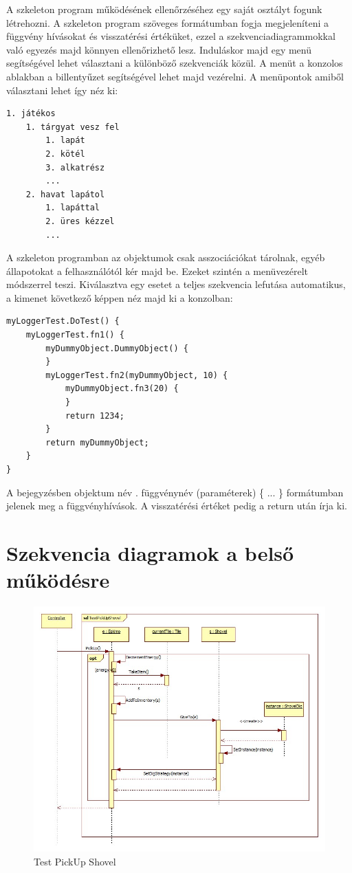 A szkeleton program működésének ellenőrzéséhez egy saját osztályt fogunk létrehozni. A szkeleton program szöveges formátumban fogja megjeleníteni a függvény hívásokat és visszatérési értéküket, ezzel a szekvenciadiagrammokkal való egyezés majd könnyen ellenőrizhető lesz. Induláskor majd egy menü segítségével lehet választani a különböző szekvenciák közül. A menüt a konzolos ablakban a billentyűzet segítségével lehet majd vezérelni. A menüpontok amiből választani lehet így néz ki:
\begin{Verbatim}[samepage=true]
1. játékos
	1. tárgyat vesz fel
		1. lapát
		2. kötél
		3. alkatrész
		...
	2. havat lapátol
		1. lapáttal
		2. üres kézzel
		...
\end{Verbatim}
A szkeleton programban az objektumok csak asszociációkat tárolnak, egyéb állapotokat a felhasználótól kér majd be. Ezeket szintén a menüvezérelt módszerrel teszi. Kiválasztva egy esetet a teljes szekvencia lefutása automatikus, a kimenet következő képpen néz majd ki a konzolban:
\begin{Verbatim}[samepage=true]
myLoggerTest.DoTest() {
    myLoggerTest.fn1() {
        myDummyObject.DummyObject() {
        }
        myLoggerTest.fn2(myDummyObject, 10) {
            myDummyObject.fn3(20) {
            }
            return 1234;
        }
        return myDummyObject;
    }
}
\end{Verbatim}
A bejegyzésben objektum név . függvénynév (paraméterek) \{ ... \} formátumban jelenek meg a függvényhívások. A visszatérési értéket pedig a return után írja ki.

\pagebreak
\section{Szekvencia diagramok a belső működésre}

\begin{figure}[H]
	\begin{center}
		\includegraphics[width=17cm]{chapters/chapter05/diagrams/TestPickUpShovel.jpg}
		\caption{Test PickUp Shovel}
		\label{fig:Test PickUp Shovel}
	\end{center}
\end{figure}

